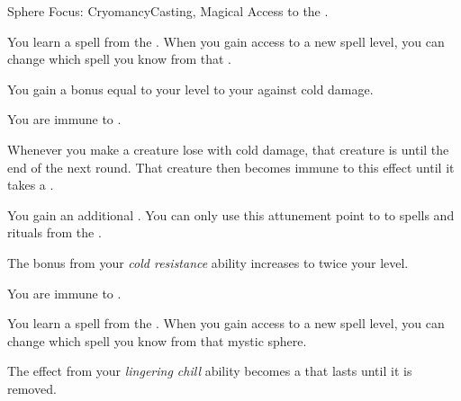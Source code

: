     \begin{feat}{Sphere Focus: Cryomancy}{Casting, Magical}
        \featpre Access to the  .

         You learn a spell from the  .
        When you gain access to a new spell level, you can change which spell you know from that .

         You gain a bonus equal to your level to your  against cold damage.

         You are immune to .

         Whenever you make a creature lose  with cold damage, that creature is  until the end of the next round.
        That creature then becomes immune to this effect until it takes a .

         You gain an additional .
        You can only use this attunement point to  to spells and rituals from the  .

         The bonus from your \textit{cold resistance} ability increases to twice your level.

         You are immune to .

         You learn a spell from the  .
        When you gain access to a new spell level, you can change which spell you know from that mystic sphere.

         The  effect from your \textit{lingering chill} ability becomes a  that lasts until it is removed.
    \end{feat}

